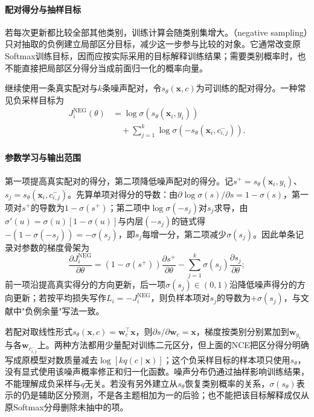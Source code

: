 \paragraph{配对得分与抽样目标}
若每次更新都比较全部其他类别，训练计算会随类别集增大。（negative sampling）只对抽取的负例建立局部区分目标，减少这一步参与比较的对象。它通常改变原Softmax训练目标，因而应按实际采用的目标解释训练结果；需要类别概率时，也不能直接把局部区分得分当成前面归一化的概率向量。

继续使用一条真实配对与$k$条噪声配对，令$s_\theta(\bm x,c)$为可训练的配对得分。一种常见负采样目标为
\begin{equation}
  \label{eq:classification-negative-sampling-objective}
  \begin{aligned}
    J_i^{\mathrm{NEG}}(\theta)
      &=\log\sigma(s_\theta(\bm x_i,y_i))\\
      &\quad+\sum_{j=1}^{k}
        \log\sigma(-s_\theta(\bm x_i,c^-_{i,j})).
  \end{aligned}
\end{equation}
\paragraph{参数学习与输出范围}
第一项提高真实配对的得分，第二项降低噪声配对的得分。记$s^+=s_\theta(\bm x_i,y_i)$、$s_j=s_\theta(\bm x_i,c^-_{i,j})$。先算单项对得分的导数：由$\partial\log\sigma(s)/\partial s=1-\sigma(s)$，第一项对$s^+$的导数为$1-\sigma(s^+)$；第二项中$\log\sigma(-s_j)$对$s_j$求导，由$\sigma'(u)=\sigma(u)[1-\sigma(u)]$与内层$(-s_j)$的链式得$-(1-\sigma(-s_j))=-\sigma(s_j)$，即$s_j$每增一分，第二项减少$\sigma(s_j)$。因此单条记录对参数的梯度骨架为
\[
  \frac{\partial J_i^{\mathrm{NEG}}}{\partial\theta}
    =(1-\sigma(s^+))\frac{\partial s^+}{\partial\theta}
      -\sum_{j=1}^{k}\sigma(s_j)\frac{\partial s_j}{\partial\theta};
\]
前一项沿提高真实得分的方向更新，后一项$\sigma(s_j)\in(0,1)$沿降低噪声得分的方向更新；若按平均损失写作$L_i=-J_i^{\mathrm{NEG}}$，则负样本项对$s_j$的导数为$+\sigma(s_j)$，与文献中"负例余量"写法一致。

若配对取线性形式$s_\theta(\bm x,c)=\bm w_c^{\top}\bm x$，则$\partial s/\partial\bm w_c=\bm x$，梯度按类别分别累加到$\bm w_{y_i}$与各$\bm w_{c^-_{i,j}}$上。两种方法都用少量配对训练二元区分，但上面的NCE把区分得分明确写成原模型对数质量减去$\log[kq(c\mid\bm x)]$；这个负采样目标的样本项只使用$s_\theta$，没有显式使用该噪声概率修正和归一化函数。噪声分布仍通过抽样影响训练结果，不能理解成负采样与$q$无关。若没有另外建立从$s_\theta$恢复类别概率的关系，$\sigma(s_\theta)$表示的仍是辅助区分预测，不是各主题相加为一的后验；也不能把该目标解释成仅从原Softmax分母删除未抽中的项。
